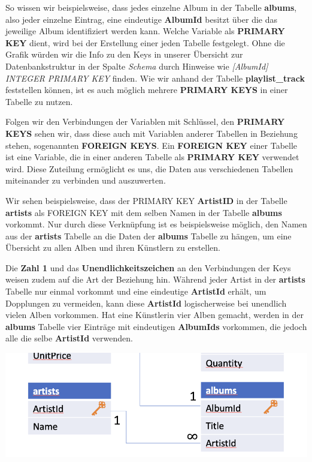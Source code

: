\documentclass[
]{book}
\begin{document}
So wissen wir beispielsweise, dass jedes einzelne Album in der Tabelle \textbf{albums}, also jeder einzelne Eintrag, eine eindeutige \textbf{AlbumId} besitzt über die das jeweilige Album identifiziert werden kann. Welche Variable als \textbf{PRIMARY KEY} dient, wird bei der Erstellung einer jeden Tabelle festgelegt. Ohne die Grafik würden wir die Info zu den Keys in unserer Übersicht zur Datenbankstruktur in der Spalte \emph{Schema} durch Hinweise wie \emph{{[}AlbumId{]} INTEGER PRIMARY KEY} finden. Wie wir anhand der Tabelle \textbf{playlist\_track} feststellen können, ist es auch möglich mehrere \textbf{PRIMARY KEYS} in einer Tabelle zu nutzen.

Folgen wir den Verbindungen der Variablen mit Schlüssel, den \textbf{PRIMARY KEYS} sehen wir, dass diese auch mit Variablen anderer Tabellen in Beziehung stehen, sogenannten \textbf{FOREIGN KEYS}. Ein \textbf{FOREIGN KEY} einer Tabelle ist eine Variable, die in einer anderen Tabelle als \textbf{PRIMARY KEY} verwendet wird. Diese Zuteilung ermöglicht es uns, die Daten aus verschiedenen Tabellen miteinander zu verbinden und auszuwerten.

Wir sehen beispielsweise, dass der PRIMARY KEY \textbf{ArtistID} in der Tabelle \textbf{artists} als FOREIGN KEY mit dem selben Namen in der Tabelle \textbf{albums} vorkommt. Nur durch diese Verknüpfung ist es beispielsweise möglich, den Namen aus der \textbf{artists} Tabelle an die Daten der \textbf{albums} Tabelle zu hängen, um eine Übersicht zu allen Alben und ihren Künstlern zu erstellen.

Die \textbf{Zahl 1} und das \textbf{Unendlichkeitszeichen} an den Verbindungen der Keys weisen zudem auf die Art der Beziehung hin. Während jeder Artist in der \textbf{artists} Tabelle nur einmal vorkommt und eine eindeutige \textbf{ArtistId} erhält, um Dopplungen zu vermeiden, kann diese \textbf{ArtistId} logischerweise bei unendlich vielen Alben vorkommen. Hat eine Künstlerin vier Alben gemacht, werden in der \textbf{albums} Tabelle vier Einträge mit eindeutigen \textbf{AlbumIds} vorkommen, die jedoch alle die selbe \textbf{ArtistId} verwenden.

\includegraphics[width=10.41667in,height=\textheight]{img-sTunes-Schema2.png}
\end{document}
